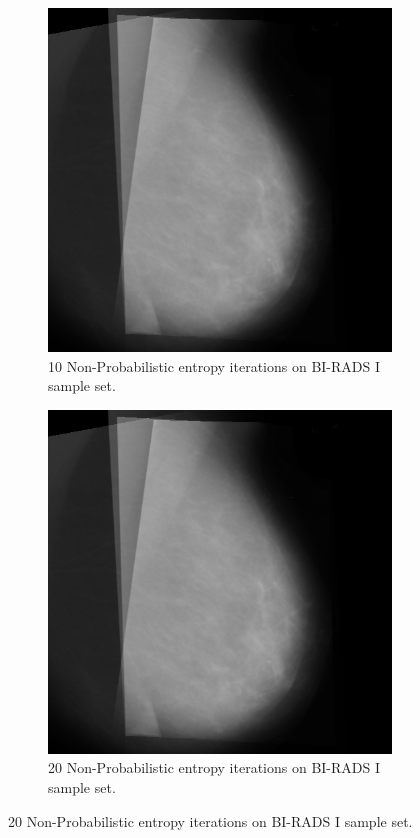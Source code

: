 \begin{figure}[H]
\begin{subfigure}[t]{0.3\textwidth}
      \includegraphics[width=\textwidth]{Chapter3/nonProb-img/nonProb10.png}
        \caption{10 Non-Probabilistic entropy iterations on BI-RADS I sample set.}
        \label{fig:10-nonProb}
    \end{subfigure} \hfill
    \begin{subfigure}[t]{0.3\textwidth}
      \includegraphics[width=\textwidth]{Chapter3/nonProb-img/nonProb20.png}
      \caption{20 Non-Probabilistic entropy iterations on BI-RADS I sample set.}
      \label{fig:20-nonProb}
    \end{subfigure}
\end{figure}

